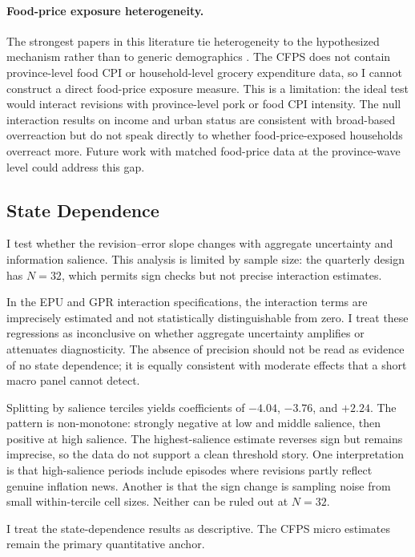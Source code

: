 \paragraph{Food-price exposure heterogeneity.}
The strongest papers in this literature tie heterogeneity to the
hypothesized mechanism rather than to generic demographics
\citep{DacuntoHoangPirolliWeber2021}. The CFPS does not contain
province-level food CPI or household-level grocery expenditure data,
so I cannot construct a direct food-price exposure measure. This is a
limitation: the ideal test would interact revisions with province-level
pork or food CPI intensity. The null interaction results on income and
urban status are consistent with broad-based overreaction but do not
speak directly to whether food-price-exposed households overreact more.
Future work with matched food-price data at the province-wave level
could address this gap.

\subsection{State Dependence}

I test whether the revision--error slope changes with aggregate
uncertainty and information salience. This analysis is limited by
sample size: the quarterly design has $N = 32$, which permits sign
checks but not precise interaction estimates.

In the EPU and GPR interaction specifications, the interaction terms
are imprecisely estimated and not statistically distinguishable from
zero. I treat these regressions as inconclusive on whether aggregate
uncertainty amplifies or attenuates diagnosticity. The absence of
precision should not be read as evidence of no state dependence; it is
equally consistent with moderate effects that a short macro panel
cannot detect.

Splitting by salience terciles yields coefficients of $-4.04$,
$-3.76$, and $+2.24$. The pattern is non-monotone: strongly negative
at low and middle salience, then positive at high salience. The
highest-salience estimate reverses sign but remains imprecise, so the
data do not support a clean threshold story. One interpretation is that
high-salience periods include episodes where revisions partly reflect
genuine inflation news. Another is that the sign change is sampling
noise from small within-tercile cell sizes. Neither can be ruled out at
$N = 32$.

I treat the state-dependence results as descriptive. The CFPS micro
estimates remain the primary quantitative anchor.

